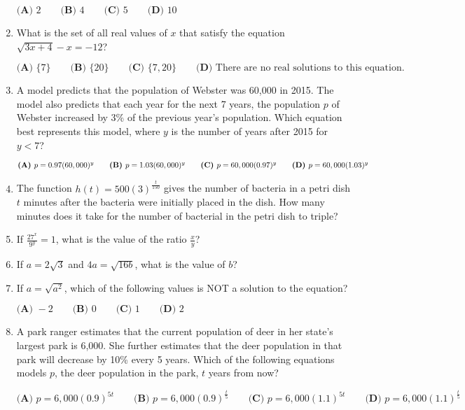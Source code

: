 \documentclass[../satmath.tex]{subfiles}
\begin{document}
\begin{enumerate}[label=\bfseries\arabic*.]
$\textbf{(A) } 2 \qquad \textbf{(B) } 4 \qquad \textbf{(C) } 5 \qquad \textbf{(D) } 10$
 
\item What is the set of all real values of $x$ that satisfy the equation $\sqrt{3x+4}-x=-12$?

$\textbf{(A) } \{7\} \qquad \textbf{(B) } \{20\} \qquad \textbf{(C) } \{7, 20\} \qquad \textbf{(D) } \text{There are no real solutions to this equation.}$

\item A model predicts that the population of Webster was 60,000 in 2015. The model also predicts that each year for the next 7 years, the population $p$ 
of Webster increased by 3\% of the previous year's population. Which equation best represents this model, where $y$ is the number of years after 2015 for $y<7$?

$\textbf{(A) } p=0.97(60,000)^y \qquad \textbf{(B) } p=1.03(60,000)^y \\ \qquad \textbf{(C) } p=60,000(0.97)^y \qquad \textbf{(D) } p=60,000(1.03)^y$

\item The function $h(t)=500(3)^{\frac{t}{150}}$ gives the number of bacteria in a petri dish $t$ minutes after the bacteria were initially placed 
in the dish. How many minutes does it take for the number of bacterial in the petri dish to triple?
 
\item If $\frac{27^x}{9^y}=1$, what is the value of the ratio $\frac{x}{y}$?
 
\item If $a=2\sqrt{3}$ and $4a=\sqrt{16b}$, what is the value of $b$?

\item If $a=\sqrt{a^2}$, which of the following values is NOT a solution to the equation?

$\textbf{(A) } -2 \qquad \textbf{(B) } 0 \qquad \textbf{(C) } 1 \qquad \textbf{(D) } 2$

\item A park ranger estimates that the current population of deer in her state's largest park is 6,000. She further estimates that the deer population 
in that park will decrease by 10\% every 5 years. Which of the following equations models $p$, the deer population in the park, $t$ years from now?

$\textbf{(A) } p=6,000(0.9)^{5t} \qquad \textbf{(B) } p=6,000(0.9)^{\frac{t}{5}} \qquad \textbf{(C) } p=6,000(1.1)^{5t} \qquad \textbf{(D) } p=6,000(1.1)^{\frac{t}{5}}$
 

\end{enumerate}
\end{document}
